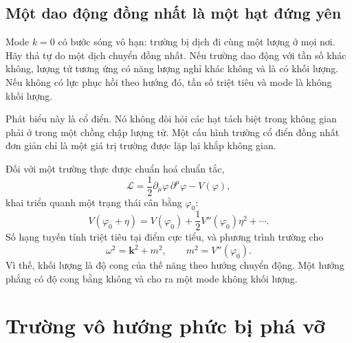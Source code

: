 \subsection{Một dao động đồng nhất là một hạt đứng yên}

Mode \(k=0\) có bước sóng vô hạn: trường bị dịch đi cùng một lượng ở mọi nơi. Hãy thả tự do một dịch chuyển đồng nhất. Nếu trường dao động với tần số khác không, lượng tử tương ứng có năng lượng nghỉ khác không và là có khối lượng. Nếu không có lực phục hồi theo hướng đó, tần số triệt tiêu và mode là không khối lượng.

Phát biểu này là cổ điển. Nó không đòi hỏi các hạt tách biệt trong không gian phải ở trong một chồng chập lượng tử. Một cấu hình trường cổ điển đồng nhất đơn giản chỉ là một giá trị trường được lặp lại khắp không gian.

\begin{classroomqa}
\end{classroomqa}

Đối với một trường thực được chuẩn hoá chuẩn tắc,
\begin{equation}
  \mathcal L
  =\frac12\partial_\mu\varphi\,\partial^\mu\varphi-V(\varphi),
\end{equation}
khai triển quanh một trạng thái cân bằng \(\varphi_0\):
\begin{equation}
  V(\varphi_0+\eta)
  =V(\varphi_0)
   +\frac12V''(\varphi_0)\eta^2+\cdots.
\end{equation}
Số hạng tuyến tính triệt tiêu tại điểm cực tiểu, và phương trình trường cho
\begin{equation}
  \omega^2=\bm{k}^2+m^2,
  \qquad
  m^2=V''(\varphi_0).
  \label{eq:l08-curvature-mass}
\end{equation}
Vì thế, khối lượng là độ cong của thế năng theo hướng chuyển động. Một hướng phẳng có độ cong bằng không và cho ra một mode không khối lượng.

\section{Trường vô hướng phức bị phá vỡ}

